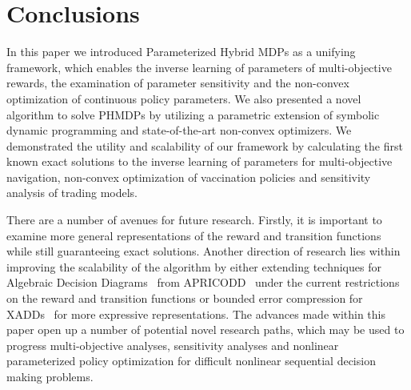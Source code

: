 \section{Conclusions}
\label{sec:conclusion}

In this paper we introduced Parameterized Hybrid MDPs as a unifying framework, which enables the inverse learning of parameters of multi-objective rewards, the examination of parameter sensitivity and the non-convex optimization of continuous policy parameters. We also presented a novel algorithm to solve PHMDPs by utilizing a parametric extension of symbolic dynamic programming and state-of-the-art non-convex optimizers. We demonstrated the utility and scalability of our framework by calculating the first known exact solutions to the inverse learning of parameters for multi-objective navigation, non-convex optimization of vaccination policies and sensitivity analysis of trading models.

There are a number of avenues for future research. Firstly, it is important to examine more general representations of the reward and transition functions while still guaranteeing exact solutions. Another direction of research lies within improving the scalability of the algorithm by either extending techniques for Algebraic Decision Diagrams~\parencite{Bahar_JoFMiSD_1993} from APRICODD~\parencite{St-Aubin_NIPS_2000} under the current restrictions on the reward and transition functions or bounded error compression for XADDs~\parencite{Vianna_UAI_2013} for more expressive representations. The advances made within this paper open up a number of potential novel research paths, which may be used to progress multi-objective analyses, sensitivity analyses and nonlinear parameterized policy optimization for difficult nonlinear sequential decision making problems.
